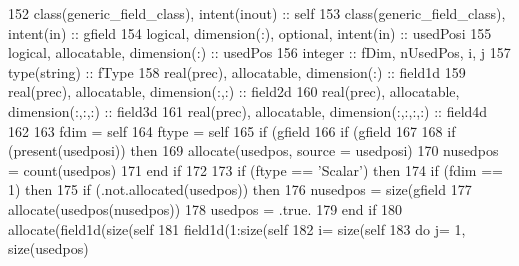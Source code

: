 \begin{DoxyCode}
152     \textcolor{keywordtype}{class}(generic\_field\_class), \textcolor{keywordtype}{intent(inout)} :: self
153     \textcolor{keywordtype}{class}(generic\_field\_class), \textcolor{keywordtype}{intent(in)} :: gfield
154     \textcolor{keywordtype}{logical}, \textcolor{keywordtype}{dimension(:)}, \textcolor{keywordtype}{optional}, \textcolor{keywordtype}{intent(in)} :: usedPosi 
155     \textcolor{keywordtype}{logical}, \textcolor{keywordtype}{allocatable}, \textcolor{keywordtype}{dimension(:)} :: usedPos
156     \textcolor{keywordtype}{integer} :: fDim, nUsedPos, i, j
157     \textcolor{keywordtype}{type}(string) :: fType
158     \textcolor{keywordtype}{real(prec)}, \textcolor{keywordtype}{allocatable}, \textcolor{keywordtype}{dimension(:)} :: field1d
159     \textcolor{keywordtype}{real(prec)}, \textcolor{keywordtype}{allocatable}, \textcolor{keywordtype}{dimension(:,:)} :: field2d
160     \textcolor{keywordtype}{real(prec)}, \textcolor{keywordtype}{allocatable}, \textcolor{keywordtype}{dimension(:,:,:)} :: field3d
161     \textcolor{keywordtype}{real(prec)}, \textcolor{keywordtype}{allocatable}, \textcolor{keywordtype}{dimension(:,:,:,:)} :: field4d
162 
163     fdim = self%
164     ftype = self%
165     \textcolor{keywordflow}{if} (gfield%
166     \textcolor{keywordflow}{if} (gfield%
167     
168     \textcolor{keywordflow}{if} (\textcolor{keyword}{present}(usedposi)) \textcolor{keywordflow}{then}
169         \textcolor{keyword}{allocate}(usedpos, source = usedposi)
170         nusedpos = count(usedpos)
171 \textcolor{keywordflow}{    end if}
172     
173     \textcolor{keywordflow}{if} (ftype == \textcolor{stringliteral}{'Scalar'}) \textcolor{keywordflow}{then}
174         \textcolor{keywordflow}{if} (fdim == 1) \textcolor{keywordflow}{then}
175             \textcolor{keywordflow}{if} (.not.\textcolor{keyword}{allocated}(usedpos)) \textcolor{keywordflow}{then}
176                 nusedpos = \textcolor{keyword}{size}(gfield%
177                 \textcolor{keyword}{allocate}(usedpos(nusedpos))
178                 usedpos = .true.
179 \textcolor{keywordflow}{            end if}
180             \textcolor{keyword}{allocate}(field1d(\textcolor{keyword}{size}(self%
181             field1d(1:\textcolor{keyword}{size}(self%
182             i= \textcolor{keyword}{size}(self%
183             \textcolor{keywordflow}{do} j= 1, \textcolor{keyword}{size}(usedpos)

\end{DoxyCode}
